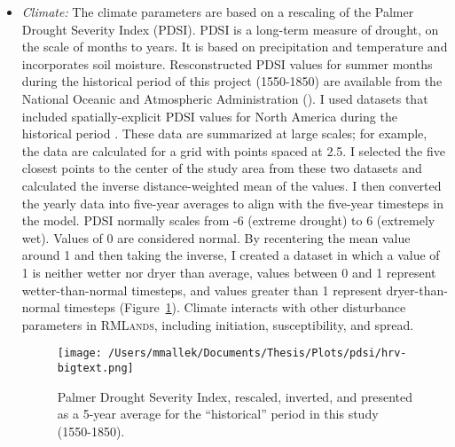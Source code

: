 \begin{itemize}
\item \emph{Climate:} The climate parameters are based on a rescaling of the Palmer Drought Severity Index (PDSI). PDSI is a long-term measure of drought, on the scale of months to years. It is based on precipitation and temperature and incorporates soil moisture. Resconstructed PDSI values for summer months during the historical period of this project (1550-1850) are available from the National Oceanic and Atmospheric Administration (). I used datasets that included spatially-explicit PDSI values for North America during the historical period \citep{Cook2004,Cook2004,Zhang2004,Zhangetal.2004}. These data are summarized at large scales; for example, the \citet{Cook2004} data are calculated for a grid with points spaced at 2.5\textdegree. I selected the five closest points to the center of the study area from these two datasets and calculated the inverse distance-weighted mean of the values. I then converted the yearly data into five-year averages to align with the five-year timesteps in the model. PDSI normally scales from -6 (extreme drought) to 6 (extremely wet). Values of 0 are considered normal. By recentering the mean value around 1 and then taking the inverse, I created a dataset in which a value of 1 is neither wetter nor dryer than average, values between 0 and 1 represent wetter-than-normal timesteps, and values greater than 1 represent dryer-than-normal timesteps (Figure~\ref{pdsi}). Climate interacts with other disturbance parameters in \textsc{RMLands}, including initiation, susceptibility, and spread.


\begin{figure}[htbp]
\centering
\texttt{[image: /Users/mmallek/Documents/Thesis/Plots/pdsi/hrv-bigtext.png]}
\caption{Palmer Drought Severity Index, rescaled, inverted, and presented as a 5-year average for the ``historical'' period in this study (1550-1850).} 
\label{pdsi}
\end{figure}



\end{itemize}
